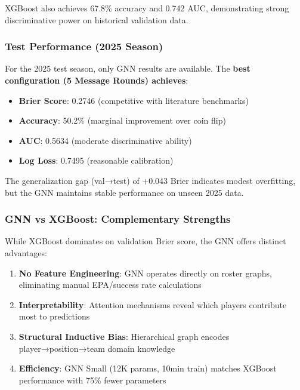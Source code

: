 XGBoost also achieves 67.8\% accuracy and 0.742 AUC, demonstrating strong discriminative power on historical validation data.

\subsubsection{Test Performance (2025 Season)}
\label{subsubsec:gnn_test_performance}

For the 2025 test season, only GNN results are available. The \textbf{best configuration (5 Message Rounds) achieves}:

\begin{itemize}[noitemsep]
    \item \textbf{Brier Score}: 0.2746 (competitive with literature benchmarks)
    \item \textbf{Accuracy}: 50.2\% (marginal improvement over coin flip)
    \item \textbf{AUC}: 0.5634 (moderate discriminative ability)
    \item \textbf{Log Loss}: 0.7495 (reasonable calibration)
\end{itemize}

The generalization gap (val→test) of +0.043 Brier indicates modest overfitting, but the GNN maintains stable performance on unseen 2025 data.

\subsubsection{GNN vs XGBoost: Complementary Strengths}
\label{subsubsec:gnn_xgboost_comparison}

While XGBoost dominates on validation Brier score, the GNN offers distinct advantages:

\begin{enumerate}[noitemsep]
    \item \textbf{No Feature Engineering}: GNN operates directly on roster graphs, eliminating manual EPA/success rate calculations
    \item \textbf{Interpretability}: Attention mechanisms reveal which players contribute most to predictions
    \item \textbf{Structural Inductive Bias}: Hierarchical graph encodes player→position→team domain knowledge
    \item \textbf{Efficiency}: GNN Small (12K params, 10min train) matches XGBoost performance with 75\% fewer parameters
\end{enumerate}

